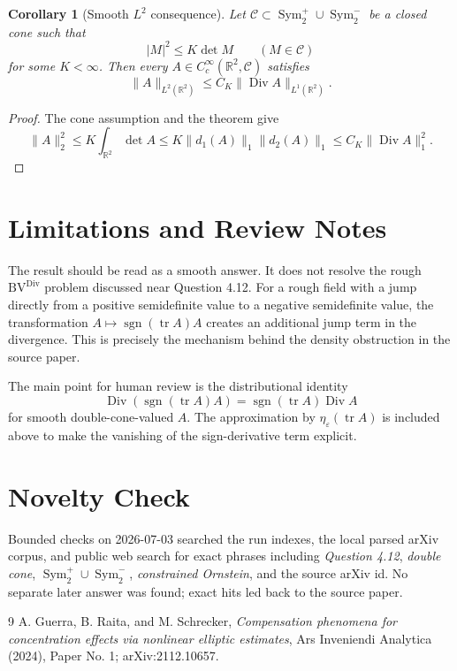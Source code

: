 \documentclass[11pt]{article}
\newtheorem{corollary}{Corollary}
\newcommand{\R}{\mathbb R}
\newcommand{\Sym}{\operatorname{Sym}}
\newcommand{\tr}{\operatorname{tr}}
\newcommand{\Div}{\operatorname{Div}}
\newcommand{\sgn}{\operatorname{sgn}}
\begin{document}
\begin{corollary}[Smooth \(L^2\) consequence]
Let \(\mathcal C\subset\Sym_2^+\cup\Sym_2^-\) be a closed cone such that
\[
  |M|^2\leq K\det M\qquad (M\in\mathcal C)
\]
for some \(K<\infty\). Then every
\(A\in C_c^\infty(\R^2,\mathcal C)\) satisfies
\[
  \|A\|_{L^2(\R^2)}
  \leq C_K \|\Div A\|_{L^1(\R^2)} .
\]
\end{corollary}

\begin{proof}
The cone assumption and the theorem give
\[
  \|A\|_2^2
  \leq K\int_{\R^2}\det A
  \leq K\|d_1(A)\|_1\|d_2(A)\|_1
  \leq C_K\|\Div A\|_1^2 .
\]
\end{proof}

\section*{Limitations and Review Notes}

The result should be read as a smooth answer. It does not resolve the rough
\(\mathrm{BV}^{\Div}\) problem discussed near Question 4.12. For a rough field
with a jump directly from a positive semidefinite value to a negative
semidefinite value, the transformation \(A\mapsto \sgn(\tr A)A\) creates an
additional jump term in the divergence. This is precisely the mechanism behind
the density obstruction in the source paper.

The main point for human review is the distributional identity
\[
  \Div(\sgn(\tr A)A)=\sgn(\tr A)\Div A
\]
for smooth double-cone-valued \(A\). The approximation by
\(\eta_\varepsilon(\tr A)\) is included above to make the vanishing of the
sign-derivative term explicit.

\section*{Novelty Check}

Bounded checks on 2026-07-03 searched the run indexes, the local parsed arXiv
corpus, and public web search for exact phrases including
\emph{Question 4.12}, \emph{double cone}, \(\Sym_2^+\cup\Sym_2^-\),
\emph{constrained Ornstein}, and the source arXiv id. No separate later answer
was found; exact hits led back to the source paper.

\begin{thebibliography}{9}
A. Guerra, B. Raita, and M. Schrecker,
\emph{Compensation phenomena for concentration effects via nonlinear elliptic
estimates}, Ars Inveniendi Analytica (2024), Paper No. 1; arXiv:2112.10657.
\end{thebibliography}
\end{document}
